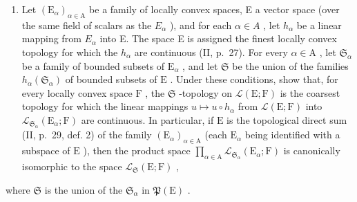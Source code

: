 \begin{enumerate}
\def\labelenumi{\arabic{enumi})}
\setcounter{enumi}{4}
\tightlist
\item
  Let \((\mathrm{E}_{\alpha})_{\alpha\in\mathrm{A}}\) be a family of locally convex spaces, E a vector space (over the same field of scalars as the \(E_{\alpha}\) ), and for each \(\alpha\in A\) , let \(h_{\alpha}\) be a linear mapping from \(E_{\alpha}\) into E. The space E is assigned the finest locally convex topology for which the \(h_{\alpha}\) are continuous (II, p.~27). For every \(\alpha \in \mathrm{A}\) , let \(\mathfrak{S}_{\alpha}\) be a family of bounded subsets of \(\mathrm{E}_{\alpha}\) , and let \(\mathfrak{S}\) be the union of the families \(h_{\alpha}(\mathfrak{S}_{\alpha})\) of bounded subsets of \(\mathrm{E}\) . Under these conditions, show that, for every locally convex space \(\mathrm{F}\) , the \(\mathfrak{S}\) -topology on \(\mathcal{L}(\mathrm{E};\mathrm{F})\) is the coarsest topology for which the linear mappings \(u\mapsto u\circ h_{\alpha}\) from \(\mathcal{L}(\mathrm{E};\mathrm{F})\) into \(\mathcal{L}_{\mathfrak{S}_{\alpha}}(\mathrm{E}_{\alpha};\mathrm{F})\) are continuous. In particular, if \(\mathrm{E}\) is the topological direct sum (II, p.~29, def. 2) of the family \((\mathrm{E}_{\alpha})_{\alpha \in \mathrm{A}}\) (each \(\mathrm{E}_{\alpha}\) being identified with a subspace of \(\mathrm{E}\) ), then the product space \(\prod_{\alpha \in \mathrm{A}}\mathcal{L}_{\mathfrak{S}_{\alpha}}(\mathrm{E}_{\alpha};\mathrm{F})\) is canonically isomorphic to the space \(\mathcal{L}_{\mathfrak{S}}(\mathrm{E};\mathrm{F})\) ,
\end{enumerate}

where \(\mathfrak{S}\) is the union of the \(\mathfrak{S}_{\alpha}\) in \(\mathfrak{P}(\mathrm{E})\) .

